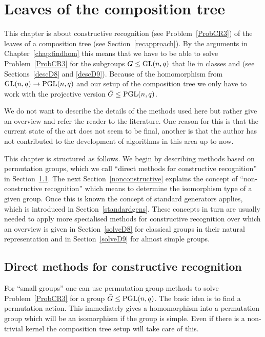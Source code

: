 
\chapter{Leaves of the composition tree}
\label{chap:leaves}

This chapter is about constructive recognition (see
Problem~\ref{ProbCR3}) of the leaves of a
composition tree (see Section~\ref{recapproach}). By the arguments in
Chapter~\ref{chap:findhom} this means that we have to be
able to solve Problem~\ref{ProbCR3} for the subgroups $G \le \GL(n,q)$
that lie in classes  and  (see Sections~\ref{descD8} and
\ref{descD9}). Because of the homomorphism from $\GL(n,q) \to
\PGL(n,q)$ and our setup of the composition tree we only have
to work with the projective version $\bar G \le \PGL(n,q)$.

We do not want to describe the details of the methods used here but
rather give an overview and refer the reader to the literature.
One reason for this is that the current state of the art does not seem
to be final, another is that the author has not contributed to the
development of algorithms in this area up to now.

This chapter is structured as follows. We begin by describing
methods based on permutation groups, which we call ``direct methods
for constructive recognition'' in Section~\ref{solvedirect}. The
next Section~\ref{nonconstructive} explains the concept of
``non-constructive recognition'' which means to determine
the isomorphism type of a given group. Once this is known the
concept of standard generators applies, which is introduced in
Section~\ref{standardgens}. These concepts in turn are usually needed to apply
more specialised methods for constructive recognition over which an
overview is given in Section~\ref{solveD8} for classical groups in
their natural representation and in
Section~\ref{solveD9} for almost simple groups.

\section{Direct methods for constructive recognition}
\label{solvedirect}

For ``small groups'' one can use permutation group methods to solve
Problem~\ref{ProbCR3} for a group $\bar G \le \PGL(n,q)$. The basic idea is
to find a permutation action. This immediately gives a homomorphism
into a permutation group which will be an isomorphism if the group is
simple. Even if there is a non-trivial kernel the composition tree setup
will take care of this.

